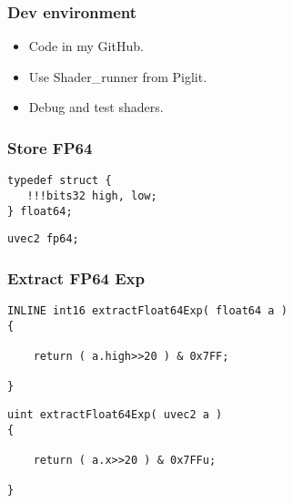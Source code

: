 \documentclass{beamer}
\begin{document}
\begin{frame}
\frametitle{Dev environment}
\begin{itemize}
\item Code in my GitHub.
\item Use Shader\_runner from Piglit.
\item Debug and test shaders.
\end{itemize}
\end{frame}


\begin{frame}[fragile] %
\frametitle{Store FP64}
\begin{example}
\begin{verbatim}
typedef struct {
   !!!bits32 high, low;
} float64;
\end{verbatim}
\end{example}

\begin{example}
\begin{verbatim}
uvec2 fp64;
\end{verbatim}
\end{example}

\end{frame}


\begin{frame}[fragile] %
\frametitle{Extract FP64 Exp}
\begin{example}
\begin{verbatim}
INLINE int16 extractFloat64Exp( float64 a )
{

    return ( a.high>>20 ) & 0x7FF;

}
\end{verbatim}
\end{example}

\begin{example}
\begin{verbatim}
uint extractFloat64Exp( uvec2 a )
{

    return ( a.x>>20 ) & 0x7FFu;
    
}
\end{verbatim}
\end{example}

\end{frame}
\end{document}
